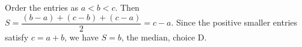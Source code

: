 Order the entries as $a<b<c$. Then $S=\dfrac{(b-a)+(c-b)+(c-a)}{2}=c-a$. Since the positive smaller entries satisfy $c=a+b$, we have $S=b$, the $\boxed{\text{median}}$, choice D.
